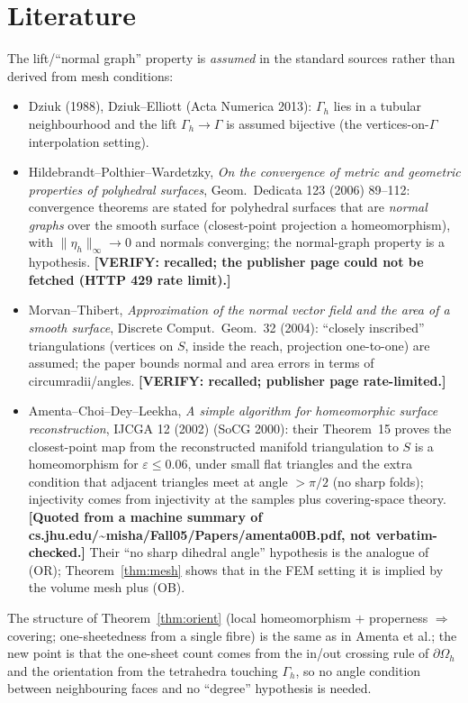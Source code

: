 \documentclass[11pt]{article}
\theoremstyle{definition}
\newcommand{\Gh}{\Gamma_h}
\newcommand{\Oh}{\Omega_h}
\newcommand{\status}[1]{\textbf{[#1]}}
\begin{document}
\section{Literature}
The lift/``normal graph'' property is \emph{assumed} in the standard sources rather than derived from mesh conditions:
\begin{itemize}
\item Dziuk (1988), Dziuk--Elliott (Acta Numerica 2013): $\Gh$ lies in a tubular neighbourhood and the lift $\Gh\to\Gamma$ is assumed bijective (the vertices-on-$\Gamma$ interpolation setting).
\item Hildebrandt--Polthier--Wardetzky, \emph{On the convergence of metric and geometric properties of polyhedral surfaces}, Geom.\ Dedicata 123 (2006) 89--112: convergence theorems are stated for polyhedral surfaces that are \emph{normal graphs} over the smooth surface (closest-point projection a homeomorphism), with $\|\eta_h\|_\infty\to0$ and normals converging; the normal-graph property is a hypothesis. \status{VERIFY: recalled; the publisher page could not be fetched (HTTP 429 rate limit).}
\item Morvan--Thibert, \emph{Approximation of the normal vector field and the area of a smooth surface}, Discrete Comput.\ Geom.\ 32 (2004): ``closely inscribed'' triangulations (vertices on $S$, inside the reach, projection one-to-one) are assumed; the paper bounds normal and area errors in terms of circumradii/angles. \status{VERIFY: recalled; publisher page rate-limited.}
\item Amenta--Choi--Dey--Leekha, \emph{A simple algorithm for homeomorphic surface reconstruction}, IJCGA 12 (2002) (SoCG 2000): their Theorem~15 proves the closest-point map from the reconstructed manifold triangulation to $S$ is a homeomorphism for $\varepsilon\le0.06$, under small flat triangles and the extra condition that adjacent triangles meet at angle $>\pi/2$ (no sharp folds); injectivity comes from injectivity at the samples plus covering-space theory. \status{Quoted from a machine summary of cs.jhu.edu/\textasciitilde misha/Fall05/Papers/amenta00B.pdf, not verbatim-checked.} Their ``no sharp dihedral angle'' hypothesis is the analogue of (OR); Theorem~\ref{thm:mesh} shows that in the FEM setting it is implied by the volume mesh plus (OB).
\end{itemize}
The structure of Theorem~\ref{thm:orient} (local homeomorphism $+$ properness $\Rightarrow$ covering; one-sheetedness from a single fibre) is the same as in Amenta et al.; the new point is that the one-sheet count comes from the in/out crossing rule of $\partial\Oh$ and the orientation from the tetrahedra touching $\Gh$, so no angle condition between neighbouring faces and no ``degree'' hypothesis is needed.
\end{document}
